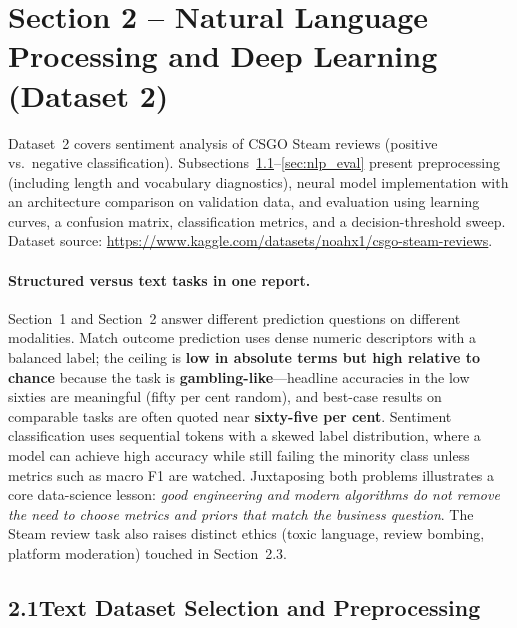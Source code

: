 \documentclass[12pt,a4paper]{article}
\begin{document}
\newpage
\pagestyle{secTwo}
\section{Section 2 -- Natural Language Processing and Deep Learning (Dataset 2)}

\noindent Dataset~2 covers sentiment analysis of CSGO Steam reviews (positive vs.\ negative classification). Subsections~\ref{sec:nlp_preprocess}--\ref{sec:nlp_eval} present preprocessing (including length and vocabulary diagnostics), neural model implementation with an architecture comparison on validation data, and evaluation using learning curves, a confusion matrix, classification metrics, and a decision-threshold sweep. Dataset source: \url{https://www.kaggle.com/datasets/noahx1/csgo-steam-reviews}.

\paragraph{Structured versus text tasks in one report.}
Section~1 and Section~2 answer different prediction questions on different modalities. Match outcome prediction uses dense numeric descriptors with a balanced label; the ceiling is \textbf{low in absolute terms but high relative to chance} because the task is \textbf{gambling-like}---headline accuracies in the low sixties are meaningful (fifty per cent random), and best-case results on comparable tasks are often quoted near \textbf{sixty-five per cent}. Sentiment classification uses sequential tokens with a skewed label distribution, where a model can achieve high accuracy while still failing the minority class unless metrics such as macro F1 are watched. Juxtaposing both problems illustrates a core data-science lesson: \textit{good engineering and modern algorithms do not remove the need to choose metrics and priors that match the business question}. The Steam review task also raises distinct ethics (toxic language, review bombing, platform moderation) touched in Section~2.3.

\subsection{2.1\quad Text Dataset Selection and Preprocessing}\label{sec:nlp_preprocess}
\end{document}
